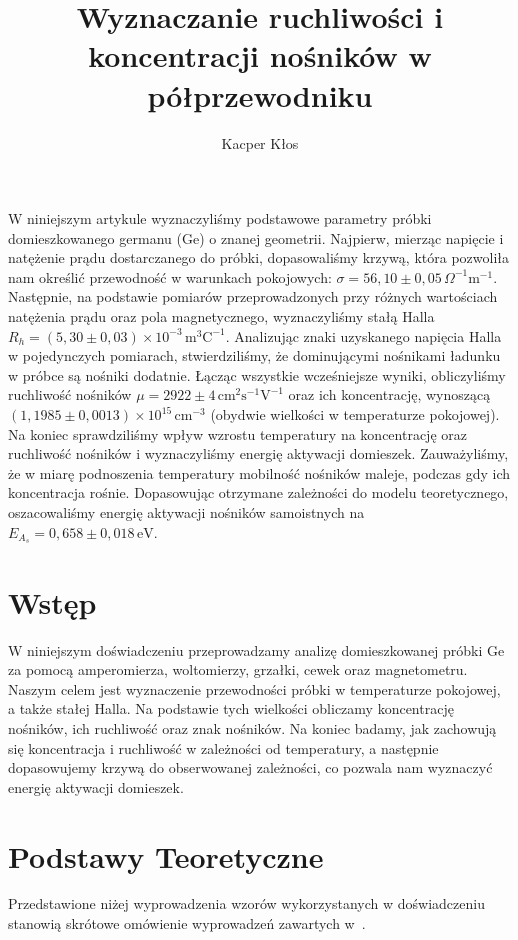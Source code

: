 \documentclass[12pt]{article}
\title{Wyznaczanie ruchliwości i koncentracji nośników w półprzewodniku}
\author{Kacper Kłos}
\begin{document}
\maketitle
W niniejszym artykule wyznaczyliśmy podstawowe parametry próbki domieszkowanego germanu (Ge) o znanej geometrii. Najpierw, mierząc napięcie i natężenie prądu dostarczanego do próbki, dopasowaliśmy krzywą, która pozwoliła nam określić przewodność w warunkach pokojowych: $\sigma = 56{,}10 \pm 0{,}05 \,\Omega^{-1}\mathrm{m}^{-1}$. Następnie, na podstawie pomiarów przeprowadzonych przy różnych wartościach natężenia prądu oraz pola magnetycznego, wyznaczyliśmy stałą Halla $R_h = (5{,}30 \pm 0{,}03)\times 10^{-3} \,\mathrm{m}^3\mathrm{C}^{-1}$. Analizując znaki uzyskanego napięcia Halla w pojedynczych pomiarach, stwierdziliśmy, że dominującymi nośnikami ładunku w próbce są nośniki dodatnie. Łącząc wszystkie wcześniejsze wyniki, obliczyliśmy ruchliwość nośników $\mu = 2922 \pm 4 \,\mathrm{cm}^2\mathrm{s}^{-1}\mathrm{V}^{-1}$ oraz ich koncentrację, wynoszącą $(1{,}1985 \pm 0{,}0013) \times 10^{15} \,\mathrm{cm}^{-3}$ (obydwie wielkości w temperaturze pokojowej). Na koniec sprawdziliśmy wpływ wzrostu temperatury na koncentrację oraz ruchliwość nośników i wyznaczyliśmy energię aktywacji domieszek. Zauważyliśmy, że w miarę podnoszenia temperatury mobilność nośników maleje, podczas gdy ich koncentracja rośnie. Dopasowując otrzymane zależności do modelu teoretycznego, oszacowaliśmy energię aktywacji nośników samoistnych na $E_{A_s} = 0{,}658 \pm 0{,}018 \,\mathrm{eV}$.

\newpage
\section{Wstęp}
W niniejszym doświadczeniu przeprowadzamy analizę domieszkowanej próbki Ge za pomocą amperomierza, woltomierzy, grzałki, cewek oraz magnetometru. Naszym celem jest wyznaczenie przewodności próbki w temperaturze pokojowej, a także stałej Halla. Na podstawie tych wielkości obliczamy koncentrację nośników, ich ruchliwość oraz znak nośników. Na koniec badamy, jak zachowują się koncentracja i ruchliwość w zależności od temperatury, a następnie dopasowujemy krzywą do obserwowanej zależności, co pozwala nam wyznaczyć energię aktywacji domieszek.

\section{Podstawy Teoretyczne}
Przedstawione niżej wyprowadzenia wzorów wykorzystanych w doświadczeniu stanowią skrótowe omówienie wyprowadzeń zawartych w~\cite{skrypt}.
\end{document}
